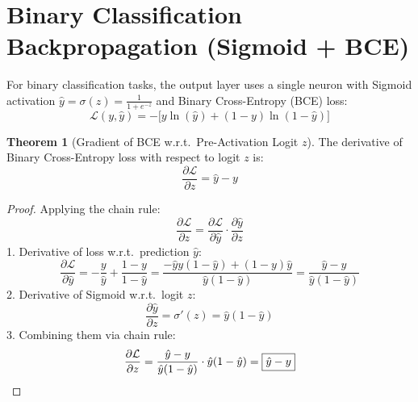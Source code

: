 \documentclass[12pt, a4paper]{report}
\theoremstyle{definition}
\newtheorem{theorem}{Theorem}[chapter]
\begin{document}
\section{Binary Classification Backpropagation (Sigmoid + BCE)}

For binary classification tasks, the output layer uses a single neuron with Sigmoid activation $\hat{y} = \sigma(z) = \frac{1}{1+e^{-z}}$ and Binary Cross-Entropy (BCE) loss:
\begin{equation}
    \mathcal{L}(y, \hat{y}) = - \bigl[ y \ln(\hat{y}) + (1 - y) \ln(1 - \hat{y}) \bigr]
\end{equation}

\begin{theorem}[Gradient of BCE w.r.t.\ Pre-Activation Logit $z$]
The derivative of Binary Cross-Entropy loss with respect to logit $z$ is:
\begin{equation}
    \frac{\partial \mathcal{L}}{\partial z} = \hat{y} - y
\end{equation}
\end{theorem}

\begin{proof}
Applying the chain rule:
\[
\frac{\partial \mathcal{L}}{\partial z} = \frac{\partial \mathcal{L}}{\partial \hat{y}} \cdot \frac{\partial \hat{y}}{\partial z}
\]
1. Derivative of loss w.r.t.\ prediction $\hat{y}$:
\[
\frac{\partial \mathcal{L}}{\partial \hat{y}} = -\frac{y}{\hat{y}} + \frac{1 - y}{1 - \hat{y}} = \frac{-\hat{y}y(1-\hat{y}) + (1-y)\hat{y}}{\hat{y}(1-\hat{y})} = \frac{\hat{y} - y}{\hat{y}(1-\hat{y})}
\]
2. Derivative of Sigmoid w.r.t.\ logit $z$:
\[
\frac{\partial \hat{y}}{\partial z} = \sigma'(z) = \hat{y}(1 - \hat{y})
\]
3. Combining them via chain rule:
\[
\frac{\partial \mathcal{L}}{\partial z} = \frac{\hat{y} - y}{\hat{y}(1-\hat{y})} \cdot \hat{y}(1 - \hat{y}) = \boxed{\hat{y} - y} \qedhere
\]
\end{proof}
\end{document}
